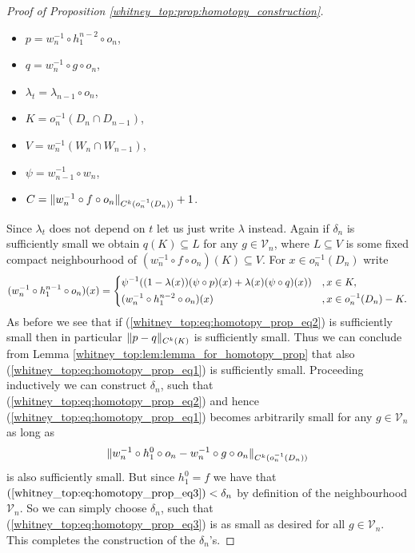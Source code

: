 \begin{proof}[Proof of Proposition \ref{whitney_top:prop:homotopy_construction}]
    \begin{itemize}
        \item $p = w_n^{-1} \circ h_1^{n-2} \circ o_n$,
        \item $q = w_n^{-1} \circ g \circ o_n$,
        \item $\lambda_t = \lambda_{n-1} \circ o_n$,
        \item $K = o_n^{-1}(D_n \cap D_{n-1})$,
        \item $V = w_n^{-1}(W_n \cap W_{n-1})$,
        \item $\psi = w_{n-1}^{-1} \circ w_n$,
        \item $C = \lVert w_n^{-1} \circ f \circ o_n\rVert_{C^k(o_n^{-1}(D_n))} + 1$.
    \end{itemize}
    Since $\lambda_t$ does not depend on $t$ let us just write $\lambda$ instead. Again if $\delta_n$ is sufficiently small we obtain $q(K) \subseteq L$ for any $g \in \mathcal{V}_n$, where $L \subseteq V$ is some fixed compact neighbourhood of $(w_n^{-1} \circ f \circ o_n)(K) \subseteq V$. For $x \in o_n^{-1}(D_n)$ write 
    \[
    (w_n^{-1} \circ h_1^{n-1} \circ o_n)(x) = \begin{dcases}
        \psi^{-1}((1-\lambda(x))(\psi \circ p)(x) + \lambda(x)(\psi \circ q)(x)) &, x \in K, \\
    (w_n^{-1} \circ h_1^{n-2} \circ o_n)(x) &, x \in o_n^{-1}(D_n) - K.
    \end{dcases}
    \]
    As before we see that if (\ref{whitney_top:eq:homotopy_prop_eq2}) is sufficiently small then in particular $\lVert p - q\rVert_{C^k(K)}$ is sufficiently small. Thus we can conclude from Lemma \ref{whitney_top:lem:lemma_for_homotopy_prop} that also (\ref{whitney_top:eq:homotopy_prop_eq1}) is sufficiently small. Proceeding inductively we can construct $\delta_n$, such that (\ref{whitney_top:eq:homotopy_prop_eq2}) and hence (\ref{whitney_top:eq:homotopy_prop_eq1}) becomes arbitrarily small for any $g \in \mathcal{V}_n$ as long as
    \begin{equation}
        \label{whitney_top:eq:homotopy_prop_eq3}
    \lVert w_n^{-1} \circ h_1^0 \circ o_n - w_n^{-1} \circ g \circ o_n\rVert_{C^k(o_n^{-1}(D_n))}  
    \end{equation}
    is also sufficiently small. But since $h_1^0 = f$ we have that $\mathrm{(\ref{whitney_top:eq:homotopy_prop_eq3})} < \delta_n$ by definition of the neighbourhood $\mathcal{V}_n$. So we can simply choose $\delta_n$, such that (\ref{whitney_top:eq:homotopy_prop_eq3}) is as small as desired for all $g \in \mathcal{V}_n$. This completes the construction of the $\delta_n$'s.


\end{proof}
